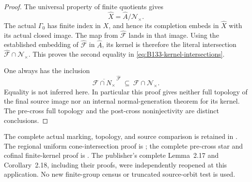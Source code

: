 \begin{proof}
The universal property of finite quotients gives
\[
 \widehat X=\widehat A/\mathcal N_\times.
\]
The actual $\Gamma_0$ has finite index in $X$, and hence its
completion embeds in $\widehat X$ with its actual closed image.
The map from $\widehat{\mathscr F}$ lands in that image.
Using the established embedding of $\widehat{\mathscr F}$
in $\widehat A$, its kernel is therefore the literal
intersection $\widehat{\mathscr F}\cap\mathcal N_\times$.
This proves the second equality in
\eqref{eq:B133-kernel-intersections}.

One always has the inclusion
\[
 \overline{\mathscr F\cap N_\times}^{\,\widehat{\mathscr F}}
       \ \subseteq\ 
 \widehat{\mathscr F}\cap\mathcal N_\times.
\]
Equality is not inferred here. In particular this proof gives
neither full topology of the final source image nor an internal
normal-generation theorem for its kernel. The pre-cross full
topology and the post-cross noninjectivity are distinct conclusions.
\end{proof}

\begingroup\raggedright\footnotesize
The complete actual marking, topology, and source comparison is
retained in
.
The regional uniform cone-intersection proof is
; the complete
pre-cross star and cofinal finite-kernel proof is
.
The publisher's complete Lemma~2.17 and Corollary~2.18, including
their proofs, were independently reopened at this application.
No new finite-group census or truncated source-orbit test is used.
\par\endgroup
